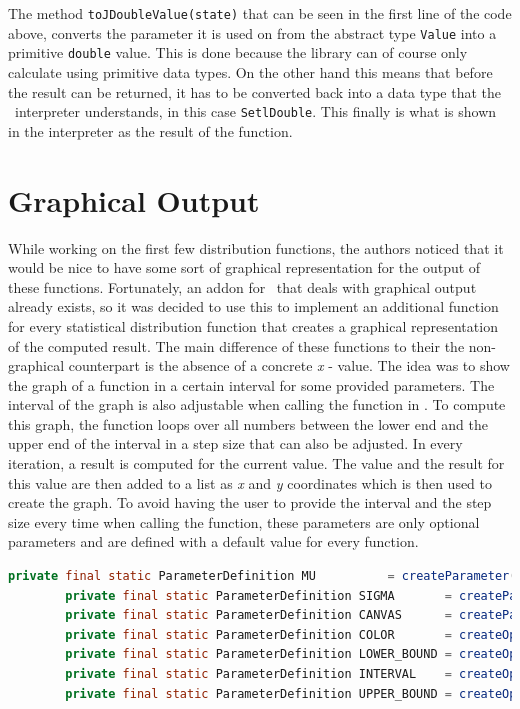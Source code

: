 The method \lstinline{toJDoubleValue(state)} that can be seen in the first line of the code above, converts the parameter it is used on from the abstract type \lstinline{Value} into a primitive \lstinline{double} value. This is done because the library can of course only calculate using primitive data types. On the other hand this means that before the result can be returned, it has to be converted back into a data type that the \setlx\ interpreter understands, in this case \lstinline{SetlDouble}. This finally is what is shown in the interpreter as the result of the function.

\section{Graphical Output}

While working on the first few distribution functions, the authors noticed that it would be nice to have some sort of graphical representation for the output of these functions. Fortunately, an addon for \setlx\ that deals with graphical output already exists, so it was decided to use this to implement an additional function for every statistical distribution function that creates a graphical representation of the computed result. The main difference of these functions to their the non-graphical counterpart is the absence of a concrete \textit{x} - value. The idea was to show the graph of a function in a certain interval for some provided parameters. The interval of the graph is also adjustable when calling the function in \setlx. To compute this graph, the function loops over all numbers between the lower end and the upper end of the interval in a step size that can also be adjusted. In every iteration, a result is computed for the current value. The value and the result for this value are then added to a list as \textit{x} and \textit{y} coordinates which is then used to create the graph. To avoid having the user to provide the interval and the step size every time when calling the function, these parameters are only optional parameters and are defined with a default value for every function.

\begin{center}
	\begin{lstlisting}[caption={Optional Parameters for Bounds and Interval}, language={java}, label=lis:boundsInterval]
		private final static ParameterDefinition MU          = createParameter("mu");
		private final static ParameterDefinition SIGMA       = createParameter("sigma");
		private final static ParameterDefinition CANVAS      = createParameter("canvas");
		private final static ParameterDefinition COLOR       = createOptionalParameter("color", new SetlString("DEFAULT_COLOR"));
		private final static ParameterDefinition LOWER_BOUND = createOptionalParameter("lowerBound", Defaults.createSetlDoubleValue(-5.0));
		private final static ParameterDefinition INTERVAL    = createOptionalParameter("interval", Defaults.getDefaultPlotInterval());
		private final static ParameterDefinition UPPER_BOUND = createOptionalParameter("upperBound", Defaults.createSetlDoubleValue(5.0));
	\end{lstlisting}
\end{center}

